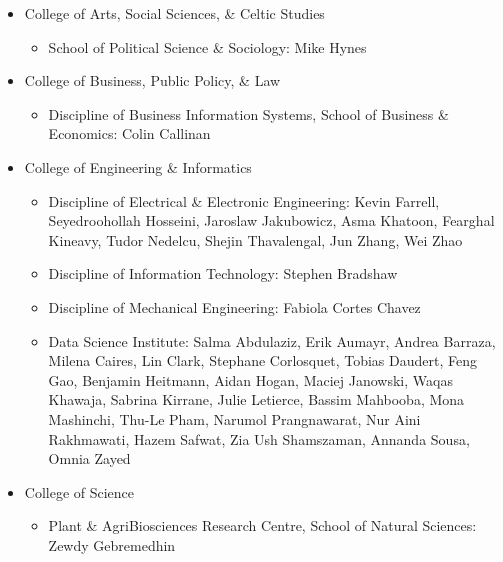 \documentclass[10pt,a4paper]{res} %
\begin{document}
\begin{resume}
\begin{itemize} \itemsep -2pt
\item College of Arts, Social Sciences, \& Celtic Studies
\begin{itemize}
\item School of Political Science \& Sociology: Mike Hynes
\end{itemize}
\item College of Business, Public Policy, \& Law
\begin{itemize}
\item Discipline of Business Information Systems, School of Business \& Economics: Colin Callinan
\end{itemize}
\item College of Engineering \& Informatics
\begin{itemize}
\item Discipline of Electrical \& Electronic Engineering: Kevin Farrell, Seyedroohollah Hosseini, Jaroslaw Jakubowicz, Asma Khatoon, Fearghal Kineavy, Tudor Nedelcu, Shejin Thavalengal, Jun Zhang, Wei Zhao
\item Discipline of Information Technology: Stephen Bradshaw
\item Discipline of Mechanical Engineering: Fabiola Cortes Chavez
\item Data Science Institute: Salma Abdulaziz, Erik Aumayr, Andrea Barraza, Milena Caires, Lin Clark, Stephane Corlosquet, Tobias Daudert, Feng Gao, Benjamin Heitmann, Aidan Hogan, Maciej Janowski, Waqas Khawaja, Sabrina Kirrane, Julie Letierce, Bassim Mahbooba, Mona Mashinchi, Thu-Le Pham, Narumol Prangnawarat, Nur Aini Rakhmawati, Hazem Safwat, Zia Ush Shamszaman, Annanda Sousa, Omnia Zayed
\end{itemize}
\item College of Science
\begin{itemize}
\item Plant \& AgriBiosciences Research Centre, School of Natural Sciences: Zewdy Gebremedhin
\end{itemize}
\end{itemize}


\vspace{0.2in} %



\end{resume}
\end{document}

